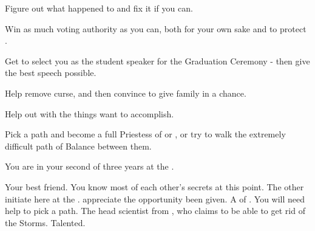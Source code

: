 \documentclass[char]{GL2020}
\begin{document}
\begin{itemz}[Goals]
	\item Figure out what happened to \cLoud{} and fix it if you can.
	\item Win as much voting authority as you can, both for your own sake and to protect \pShip{}.
	\item Get \cBeetle{} to select you as the student speaker for the Graduation Ceremony - then give the best speech possible.
	\item Help \cInitiate{} remove \cInitiate{\their} curse, and then convince \cInitiate{\them} to give \cInitiate{\their} family in \pFarm{} a chance.
	\item Help \cHeir{} out with the things \cHeir{\they} want to accomplish.
	\item Pick a path and become a full Priestess of \cEbb{} or \cFlow{}, or try to walk the extremely difficult path of Balance between them.
\end{itemz}

\begin{itemz}[Notes]
	\item You are in your second of three years at the \pSchool{}.
\end{itemz}

\begin{contacts}
	\contact{\cHeir{}} Your best friend. You know most of each other’s secrets at this point.
	\contact{\cInitiate{}} The other \pShippies{} initiate here at the \pSc{}. \cInitiate{\They}  appreciate the opportunity \cInitiate{\they}  \cInitiate{\have} been given.
	\contact{\cFlowPriest{}} A \cFlowPriest{\cleric} of \cFlow{}. You will need \cFlowPriest{\their} help to pick a path.
\contact{\cHeadScientist{}} The head scientist from \pTech{}, who claims to be able to get rid of the Storms. Talented.
\end{contacts}
\end{document}
